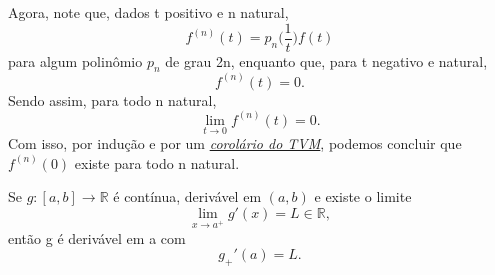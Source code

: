 \documentclass[../distribution_theory_notes.tex]{subfiles}
\begin{document}
Agora, note que, dados t positivo e n natural,
\[
	f^{(n)}(t)=p_{n}\biggl(\frac{1}{t}\biggr)f(t)
\]
para algum polinômio \(p_{n}\) de grau 2n, enquanto que, para t negativo e natural,
\[
	f^{(n)}(t)=0.
\]
Sendo assim, para todo n natural,
\[
	\lim_{t\to 0}f^{(n)}(t)=0.
\]
Com isso, por indução e por um \hyperlink{tvm_cor}{\textit{corolário do TVM}}, podemos concluir que \(f^{(n)}(0)\) existe para todo n natural.

\begin{tcolorbox}[
		skin=enhanced,
		title=Lembrete!,
		after title={\hfill Corolário do TVM},
		fonttitle=\bfseries,
		sharp corners=downhill,
		colframe=black,
		colbacktitle=yellow!75!white,
		colback=yellow!30,
		colbacklower=black,
		coltitle=black,
		drop large lifted shadow
	]
	\hypertarget{tvm_cor}{
		\begin{crl*}
			Se \(g:[a, b]\rightarrow \mathbb{R}\) é contínua, derivável em \((a, b)\) e existe o limite
			\[
				\lim_{x\to a^{+}}g'(x)=L\in \mathbb{R},
			\]
			então g é derivável em a com
			\[
				g_{+}'(a)=L.
			\]
		\end{crl*}
	}
\end{tcolorbox}
\end{document}
